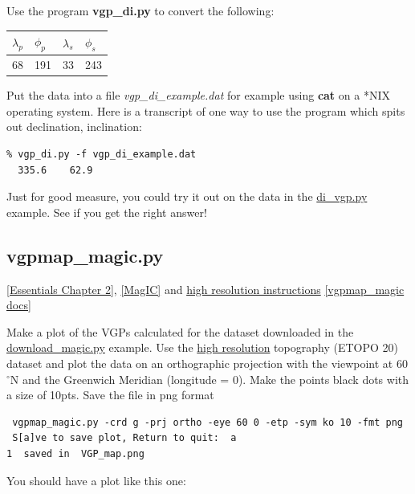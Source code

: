 \documentclass[11pt]{book}
\begin{document}
{{Use the program {\bf vgp\_di.py} to convert the
following:  


\begin{tabular}{llll}
\hline
$\lambda_p$\qquad &$\phi_p$ \qquad & $\lambda_s$\qquad & $\phi_s$ \\
\hline
68 \qquad & 191 \qquad & 33 \qquad & 243\\
\hline
\end{tabular}
 
 Put the data into a file {\it vgp\_di\_example.dat} for example using {\bf cat} on a *NIX operating system.  
Here is a transcript of one way to use the program which spits out declination, inclination: 
 
\begin{verbatim}
% vgp_di.py -f vgp_di_example.dat
  335.6    62.9
\end{verbatim}

Just for good measure, you could try it out on the data in the \href{#di_vgp.py}{di\_vgp.py} example.  See if you get the right answer!

\subsection{vgpmap\_magic.py}
\href{http://magician.ucsd.edu/Essentials_2/WebBook2ch2.html#ch2}{[Essentials Chapter 2]},  \href{#MagIC}{[MagIC]} and   \href{http://earthref.org/PmagPy/hires.html}{high resolution instructions}
\href{http://earthref.org/PmagPy/pmagpydocs/vgpmap_magic-module.html}{[vgpmap\_magic docs]}

Make a plot of the VGPs calculated for the dataset downloaded in the \href{#download_magic.py}{download\_magic.py} example.  Use the  \href{http://earthref.org/PmagPy/hires.html}{high resolution}
 topography (ETOPO 20) dataset and plot the data on an orthographic projection with the viewpoint at 60$^{\circ}$N and the Greenwich Meridian (longitude = 0).  Make the points black dots with a size of 10pts.   Save the file in png format

\begin{verbatim}
 vgpmap_magic.py -crd g -prj ortho -eye 60 0 -etp -sym ko 10 -fmt png
 S[a]ve to save plot, Return to quit:  a
1  saved in  VGP_map.png
\end{verbatim}



You should have a plot like this one:  

}}
\end{document}
